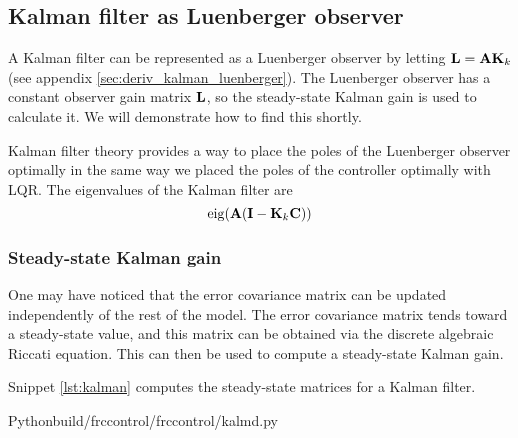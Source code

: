 \subsection{Kalman filter as Luenberger observer}

A Kalman filter can be represented as a Luenberger \gls{observer} by letting
$\mathbf{L} = \mathbf{A} \mathbf{K}_k$ (see appendix \ref{sec:deriv_kalman_luenberger}).
The Luenberger observer has a constant observer gain matrix $\mathbf{L}$, so the
steady-state Kalman gain is used to calculate it. We will demonstrate how to
find this shortly.

Kalman filter theory provides a way to place the poles of the Luenberger
observer optimally in the same way we placed the poles of the controller
optimally with LQR. The eigenvalues of the Kalman filter are
\begin{equation}
  \operatorname{eig}(\mathbf{A}(\mathbf{I} - \mathbf{K}_k\mathbf{C}))
\end{equation}

\subsubsection{Steady-state Kalman gain}

One may have noticed that the error covariance matrix can be updated
independently of the rest of the \gls{model}. The error covariance matrix tends
toward a steady-state value, and this matrix can be obtained via the discrete
algebraic Riccati equation. This can then be used to compute a steady-state
Kalman gain.

Snippet \ref{lst:kalman} computes the steady-state matrices for a Kalman
filter.
\begin{code}{Python}{build/frccontrol/frccontrol/kalmd.py}
  \caption{Steady-state Kalman gain and error covariance matrices calculation in
    Python}
  \label{lst:kalman}
\end{code}
